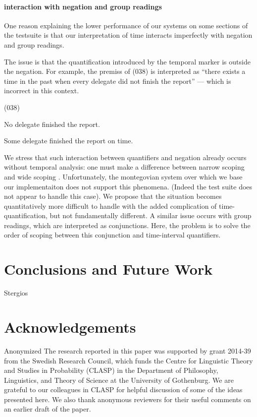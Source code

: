 \documentclass[a4paper,11pt]{article}
\newcommand\hyp{\item[H]}
\newcommand\fracasex[2]{\begin{lingex}\item[(#1)] \begin{subex} #2 \end{subex} \end{lingex} }
\begin{document}
\paragraph{interaction with negation and group readings}
One reason explaining the lower performance of our systems on some
sections of the testsuite is that our interpretation of time interacts
imperfectly with negation and group readings.

The issue is that the quantification introduced by the temporal marker
is outside the negation. For example, the premiss of (038) is
interpreted as ``there exists a time in the past when every delegate
did not finish the report'' --- which is incorrect in this context.
\fracasex{038}{
\item	No delegate finished the report.
\hyp 	Some delegate finished the report on time.
}
%
We stress that such interaction between quantifiers and negation
already occurs without temporal analysis: one must make a difference
between narrow scoping and wide scoping \cite{todo}. Unfortunately,
the montegovian system over which we base our implementaiton does not
support this phenomena. (Indeed the test suite does not appear to
handle this case). We propose that the situation becomes
quantitatively more difficult to handle with the added complication of
time-quantification, but not fundamentally different.
%
A similar issue occurs with group readings, which are interpreted as
conjunctions. Here, the problem is to solve the order of scoping
between this conjunction and time-interval quantifiers.

\section{Conclusions and Future Work}
Stergios
\section*{Acknowledgements}

\ifanon
Anonymized
\else
The research reported in this paper was supported by grant 2014-39 from the
Swedish Research Council, which funds the Centre for Linguistic Theory and
Studies in Probability (CLASP) in the Department of Philosophy, Linguistics,
and Theory of Science at the University of Gothenburg. We are grateful to
our colleagues in CLASP for helpful discussion of some of the ideas presented
here. We also thank anonymous reviewers for their useful comments on an
earlier draft of the paper.
\fi

\end{document}
